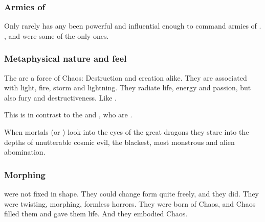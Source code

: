 




\subsubsection{Armies of \dragons}
Only rarely has any \dragon been powerful and influential enough to command armies of \dragons. 
\Sethicus, \Nexagglachel and \Ishnaruchaefir were some of the only ones. 






\subsubsection{Metaphysical nature and feel}
The \dragons{} are a force of Chaos: Destruction and creation alike. 
They are associated with light, fire, storm and lightning. 
They radiate life, energy and passion, but also fury and destructiveness. 
Like . 

This is in contrast to the \banes{} and \resphain, who are . 

When mortals (or \resphain) look into the eyes of the great dragons they stare into the depths of unutterable cosmic evil, the blackest, most monstrous and alien abomination. 





\subsubsection{Morphing}
\Dragons were not fixed in shape.
They could change form quite freely, and they did.
They were twisting, morphing, formless horrors. 
They were born of Chaos, and Chaos filled them and gave them life. 
And they embodied Chaos. 

